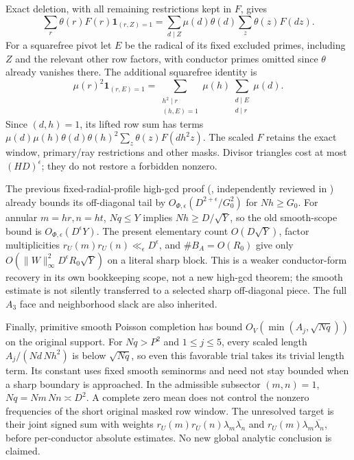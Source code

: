 Exact deletion, with all remaining restrictions kept in $F$, gives
\[
 \sum_r\theta(r)F(r)\mathbf1_{(r,Z)=1}
 =\sum_{d\mid Z}\mu(d)\theta(d)\sum_z\theta(z)F(dz).
\]
For a squarefree pivot let $E$ be the radical of its fixed excluded
primes, including $Z$ and the relevant other row factors, with
conductor primes omitted since $\theta$ already vanishes there.
The additional squarefree identity is
\[
 \mu(r)^2\mathbf1_{(r,E)=1}
 =\sum_{\substack{h^2\mid r\\(h,E)=1}}\mu(h)
       \sum_{\substack{d\mid E\\d\mid r}}\mu(d).
\]
Since $(d,h)=1$, its lifted row sum has terms
$\mu(d)\mu(h)\theta(d)\theta(h)^2\sum_z\theta(z)F(dh^2z)$.
The scaled $F$ retains the exact window, primary/ray restrictions and
other masks. Divisor triangles cost at most $(HD)^\epsilon$;
they do not restore a forbidden nonzero.

The previous fixed-radial-profile high-gcd proof
(, independently reviewed in
)
already bounds its off-diagonal tail by
$O_{\Phi,\epsilon}(D^{2+\epsilon}/G_0^2)$ for $Nh\ge G_0$.
For annular $m=hr,n=ht$, $Nq\le Y$ implies $Nh\ge D/\sqrt Y$,
so the old smooth-scope bound is $O_{\Phi,\epsilon}(D^\epsilon Y)$.
The present elementary count $O(D\sqrt Y)$, factor multiplicities
$r_U(m)r_U(n)\ll_\epsilon D^\epsilon$, and $\#B_A=O(R_0)$ give only
$O(\|W\|_\infty^2D^\epsilon R_0\sqrt Y)$ on a literal sharp block.
This is a weaker conductor-form recovery in its own bookkeeping scope,
not a new high-gcd theorem; the smooth estimate is not silently
transferred to a selected sharp off-diagonal piece.
The full $A_3$ face and neighborhood slack are also inherited.

Finally, primitive smooth Poisson completion has bound
$O_V(\min(A_j,\sqrt{Nq}))$ on the original support.
For $Nq>P^2$ and $1\le j\le5$, every scaled length
$A_j/(Nd\,Nh^2)$ is below $\sqrt{Nq}$, so even this favorable trial
takes its trivial length term. Its constant uses fixed smooth
seminorms and need not stay bounded when a sharp boundary is approached.
In the admissible subsector $(m,n)=1$, $Nq=Nm\,Nn\asymp D^2$.
A complete zero mean does not control the nonzero frequencies of the
short original masked row window. The unresolved target is their
joint signed sum with weights $r_U(m)r_U(n)\lambda_m\overline{\lambda_n}$
and $r_U(m)\lambda_m\overline{\lambda_n}$, before per-conductor absolute
estimates. No new global analytic conclusion is claimed.
